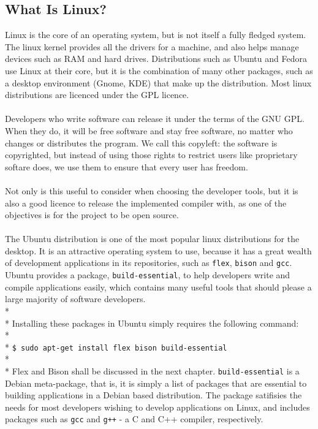 \documentclass[12pt]{report}
\begin{document}
\subsection{What Is Linux?}\label{subsec:what_is_linux}
Linux is the core of an operating system, but is not itself a fully fledged system.  The linux kernel provides all the drivers for a machine, and also helps manage devices such as RAM and hard drives.  Distributions such as Ubuntu and Fedora use Linux at their core, but it is the combination of many other packages, such as a desktop environment (Gnome, KDE) that make up the distribution.  Most linux distributions are licenced under the GPL licence.\\
\\
Developers who write software can release it under the terms of the GNU GPL.  When they do, it will be free software and stay free software, no matter who changes or distributes the program.  We call this copyleft: the software is copyrighted, but instead of using those rights to restrict users like proprietary softare does, we use them to ensure that every user has freedom. \citep{quickguidetogpl3}
\\
\\
Not only is this useful to consider when choosing the developer tools, but it is also a good licence to release the implemented compiler with, as one of the objectives is for the project to be open source.\\
\\
The Ubuntu distribution is one of the most popular linux distributions for the desktop.  It is an attractive operating system to use, because it has a great wealth of development applications in its repositories, such as \texttt{flex}, \texttt{bison} and \texttt{gcc}.  Ubuntu provides a package, \texttt{build-essential}, to help developers write and compile applications easily, which contains many useful tools that should please a large majority of software developers.\\*
\\*
Installing these packages in Ubuntu simply requires the following command:
\\*
\\*
\texttt{\$ sudo apt-get install flex bison build-essential}
\\*
\\*
Flex and Bison shall be discussed in the next chapter.  \texttt{build-essential} is a Debian meta-package, that is, it is simply a list of packages that are essential to building applications in a Debian based distribution.  The package satifisies the needs for most developers wishing to develop applications on Linux, and includes packages such as \texttt{gcc} and \texttt{g++} - a C and C++ compiler, respectively.
\end{document}
